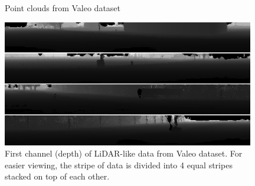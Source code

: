\begin{figure}
\centering
{}
\hfil
{}
\caption{Point clouds from Valeo dataset}
\end{figure}

\begin{figure}[H]
\centering
\includegraphics[width=0.98\textwidth,keepaspectratio]{img/valeolidardepth.png}
\caption[First channel of LiDAR-like data from Valeo dataset]{First channel (depth) of LiDAR-like data from Valeo dataset. For easier viewing, the stripe of data is divided into 4 equal stripes stacked on top of each other.}
\label{valeolidardepth}
\end{figure}

